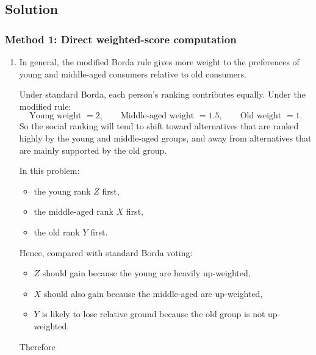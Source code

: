 \documentclass[12pt]{article}
\begin{document}
\newpage

\subsection{Solution}

\subsubsection{Method 1: Direct weighted-score computation}

\begin{enumerate}[label=(\alph*)]
    \item
    In general, the modified Borda rule gives more weight to the preferences of young and middle-aged consumers relative to old consumers.

    Under standard Borda, each person's ranking contributes equally. Under the modified rule:
    \[
    \text{Young weight }=2,
    \qquad
    \text{Middle-aged weight }=1.5,
    \qquad
    \text{Old weight }=1.
    \]
    So the social ranking will tend to shift toward alternatives that are ranked highly by the young and middle-aged groups, and away from alternatives that are mainly supported by the old group.

    In this problem:
    \begin{itemize}[leftmargin=*]
        \item the young rank \(Z\) first,
        \item the middle-aged rank \(X\) first,
        \item the old rank \(Y\) first.
    \end{itemize}

    Hence, compared with standard Borda voting:
    \begin{itemize}[leftmargin=*]
        \item \(Z\) should gain because the young are heavily up-weighted,
        \item \(X\) should also gain because the middle-aged are up-weighted,
        \item \(Y\) is likely to lose relative ground because the old group is not up-weighted.
    \end{itemize}

    Therefore
    \begin{center}
    \end{center}


\end{enumerate}
\end{document}
